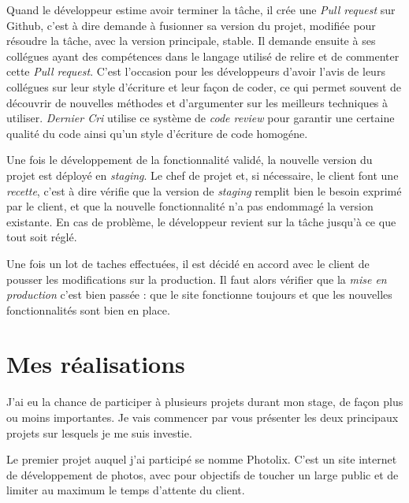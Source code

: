 \documentclass[12pt,a4paper]{article}
\begin{document}
  \bigskip

  Quand le développeur estime avoir terminer la tâche, il crée une
  \emph{Pull request} sur Github, c'est à dire demande à fusionner sa
  version du projet, modifiée pour résoudre la tâche, avec la version
  principale, stable. Il demande ensuite à ses collégues ayant des
  compétences dans le langage utilisé de relire et de commenter cette
  \emph{Pull request}. C'est l'occasion pour les développeurs d'avoir
  l'avis de leurs collégues sur leur style d'écriture et leur façon de
  coder, ce qui permet souvent de découvrir de nouvelles méthodes et
  d'argumenter sur les meilleurs techniques à utiliser. \emph{Dernier Cri}
  utilise ce système de \emph{code review} pour garantir une certaine
  qualité du code ainsi qu'un style d'écriture de code homogéne.

  \bigskip

  Une fois le développement de la fonctionnalité validé, la nouvelle
  version du projet est déployé en \emph{staging}. Le chef de projet et,
  si nécessaire, le client font une \emph{recette}, c'est à dire vérifie
  que la version de \emph{staging} remplit bien le besoin exprimé par le
  client, et que la nouvelle fonctionnalité n'a pas endommagé la version
  existante. En cas de problème, le développeur revient sur la tâche
  jusqu'à ce que tout soit réglé.

  \bigskip

  Une fois un lot de taches effectuées, il est décidé en accord avec le
  client de pousser les modifications sur la production. Il faut alors
  vérifier que la \emph{mise en production} c'est bien passée : que le
  site fonctionne toujours et que les nouvelles fonctionnalités sont bien
  en place.

  \newpage

  \section{Mes réalisations}\label{mes-ruxe9alisations}

  \bigskip

  J'ai eu la chance de participer à plusieurs projets durant mon stage, de
  façon plus ou moins importantes. Je vais commencer par vous présenter
  les deux principaux projets sur lesquels je me suis investie.

  \bigskip

  Le premier projet auquel j'ai participé se nomme Photolix. C'est un site
  internet de développement de photos, avec pour objectifs de toucher un
  large public et de limiter au maximum le temps d'attente du client.
\end{document}
